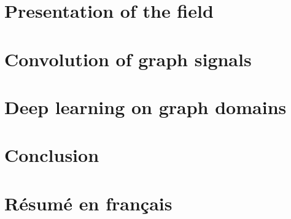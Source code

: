 \documentclass[12pt]{book}
\begin{document}
%
%

  \chapter{Presentation of the field}\label{chap:1}
  \minitoc\newpage
  \newpage

  \newpage
  \newpage
  \newpage

%
%

\setcounter{chapter}{1}
\chapter{Convolution of graph signals}\label{chap:2}
  \minitoc\newpage
  \newpage

\newpage
\newpage
\newpage
\newpage
\newpage

%
%
 \setcounter{chapter}{2}
 \chapter{Deep learning on graph domains}\label{chap:3}
  \minitoc\newpage
  \newpage


 \newpage
 \newpage
 \newpage
 \newpage
 \newpage

%
%

\pagestyle{plain}
\chapter*{Conclusion}\label{chp:ccl}


%
%

\backmatter
\printbibliography[heading=bibintoc]

%
%

\clearpage
\chapter*{Résumé en français}\label{chp:rsm}

\end{document}
